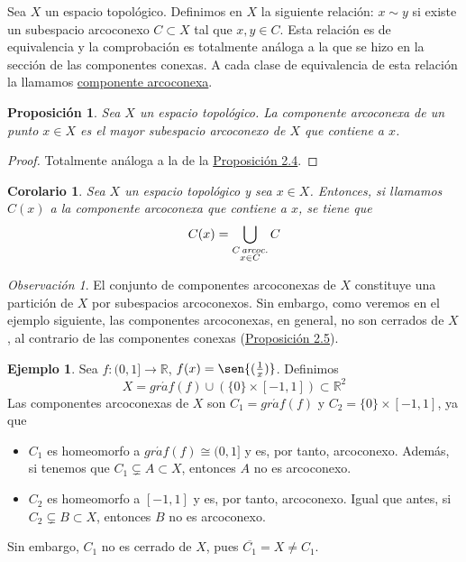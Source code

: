\documentclass[12pt]{report}
\newtheorem{proposition}{Proposición}[chapter]
\newtheorem{corollary}{Corolario}[chapter]
\theoremstyle{definition}
\theoremstyle{definition}
\newtheorem{example}{Ejemplo}[chapter]
\theoremstyle{remark}
\newtheorem*{obs}{Observación} %
\newcommand{\R}{\mathbb R}
\begin{document}
Sea $X$ un espacio topológico. Definimos en $X$ la siguiente relación: $x \sim y$ si existe un subespacio arcoconexo $C \subset X$ tal que $x,y \in C$. Esta relación es de equivalencia y la comprobación es totalmente análoga a la que se hizo en la sección de las componentes conexas. A cada clase de equivalencia de esta relación la llamamos \underline{componente arcoconexa}.

\begin{proposition}
Sea $X$ un espacio topológico. La componente arcoconexa de un punto $x \in X$ es el mayor subespacio arcoconexo de $X$ que contiene a $x$.
\end{proposition}

\begin{proof}
Totalmente análoga a la de la \hyperref[prop2.4.]{\color{blue}Proposición 2.4}.
\end{proof}

\begin{corollary}
Sea $X$ un espacio topológico y sea $x \in X$. Entonces, si llamamos $C(x)$ a la componente arcoconexa que contiene a $x$, se tiene que \[C(x) = \bigcup_{\substack{C \, \emph{arcoc.} \\ x \in C}}C\]
\end{corollary}

\begin{obs}
El conjunto de componentes arcoconexas de $X$ constituye una partición de $X$ por subespacios arcoconexos. Sin embargo, como veremos en el ejemplo siguiente, las componentes arcoconexas, en general, no son cerrados de $X$, al contrario de las componentes conexas (\hyperref[prop2.5.]{\color{blue}Proposición 2.5}).
\end{obs}

\begin{example}
Sea $f \colon (0,1] \to \R$, $f(x) = \sen{(\frac{1}{x})}$. Definimos 
\[X = gr\acute{a}f(f) \cup (\{0\} \times [-1,1]) \subset \R^2\]
Las componentes arcoconexas de $X$ son $C_1 = gr\acute{a}f(f)$ y $C_2 = \{0\} \times [-1,1]$, ya que
\begin{itemize}
    \item $C_1$ es homeomorfo a $gr\acute{a}f(f) \cong (0,1]$ y es, por tanto, arcoconexo. Además, si tenemos que $C_1 \subsetneq A \subset X$, entonces $A$ no es arcoconexo.
    \item $C_2$ es homeomorfo a $[-1,1]$ y es, por tanto, arcoconexo. Igual que antes, si $C_2 \subsetneq B \subset X$, entonces $B$ no es arcoconexo.
\end{itemize}
Sin embargo, $C_1$ no es cerrado de $X$, pues $\overline{C_1} = X \neq C_1$.
\end{example}
\end{document}
